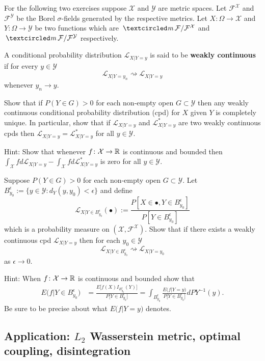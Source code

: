 For the following two exercises suppose $\mathcal X$  and $\mathcal Y$ are metric spaces. Let $ \mathcal F^{\mathcal X}$ and $\mathcal F^{\mathcal Y}$ be the Borel $\sigma$-fields generated by the respective metrics.  Let $X\colon \Omega \rightarrow\mathcal X$ and $Y\colon \Omega\rightarrow \mathcal Y$ be two functions which are $\mcirc \mathcal F/\mathcal F^{\mathcal X}$ and $\mcirc \mathcal F/\mathcal F^{\mathcal Y}$ respectively.

\begin{definition}
A conditional probability distribution $\mathcal L_{X|Y=y}$ is said to be  {\bf weakly continuous} if for every $y\in \mathcal Y$
\[
\mathcal L_{X|Y=y_n} \rightsquigarrow  \mathcal L_{X|Y=y}
\]
whenever $y_n\rightarrow y$.
\end{definition}


\begin{exercise}
\label{continuous uniqueness}
Show that if $P(Y\in G)>0$ for each non-empty open $G\subset \mathcal Y$ then any weakly continuous conditional probability distribution (cpd) for $X$ given $Y$ is completely unique. In particular, show that if $\mathcal L_{X|Y=y}$ and  $\mathcal L^*_{X|Y=y}$ are two weakly continuous cpds then $\mathcal L_{X|Y=y}=\mathcal L^*_{X|Y=y}$ for all $y\in \mathcal Y$.

Hint: Show that whenever $f\colon \mathcal X\rightarrow \Bbb R$ is continuous and bounded then $\int_{\mathcal X} f d\mathcal L_{X|Y=y} - \int_{\mathcal X} f d\mathcal L^*_{X|Y=y}$
is zero for all $y\in \mathcal Y$.
\end{exercise}

\begin{exercise}
\label{limiting construction}
Suppose $P(Y\in G)>0$ for each non-empty open $G\subset \mathcal Y$. Let $B_{y_0}^\epsilon := \{y\in\mathcal Y\colon d_Y(y,y_0)<\epsilon \}$ and  define
\[
\mathcal L_{X|Y\in B_{y_0}^\epsilon}(\bullet):=\frac{P[X\in \bullet, Y\in B_{y_0}^\epsilon]}{P[Y\in B_{y_0}^\epsilon]}
\]
which is a probability measure on $(\mathcal X, \mathcal F^{\mathcal X})$.
Show that if there exists a weakly continuous cpd  $\mathcal L_{X|Y=y}$  then for each $y_0\in \mathcal Y$
\[
\mathcal L_{X|Y\in B_{y_0}^\epsilon} \rightsquigarrow  \mathcal L_{X|Y=y_0}
\]
 as $\epsilon\rightarrow 0$.


Hint: When $f\colon \mathcal X\rightarrow \Bbb R$ is continuous and bounded show that
\begin{align*}
E\bigl(f| Y\in B_{y_0}^\epsilon\bigr) &= \frac{E\bigl[f(X)I_{B_{y_0}^\epsilon}(Y)\bigr]}{P\bigl[Y\in B_{y_0}^\epsilon\bigr]} = \int_{B_{y_0}^\epsilon}\frac{E\bigl(f|Y=y \bigr)}{P\bigl[Y\in B_{y_0}^\epsilon\bigr]}  dPY^{-1}(y).
\end{align*}
Be sure to be precise about what $E\bigl(f|Y=y \bigr)$ denotes.
\end{exercise}



\subsection{Application: $L_2$ Wasserstein metric, optimal coupling, disintegration}
